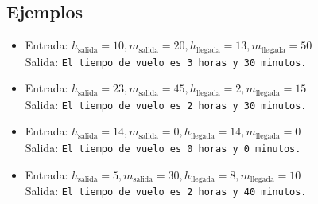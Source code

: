 \begin{enumerate}[label=\alph*)]
    \subsection*{Ejemplos}
    \begin{itemize}
        \item Entrada: \(h_{\text{salida}} = 10, m_{\text{salida}} = 20, h_{\text{llegada}} = 13, m_{\text{llegada}} = 50\)\\
              Salida: \texttt{El tiempo de vuelo es 3 horas y 30 minutos.}
        \item Entrada: \(h_{\text{salida}} = 23, m_{\text{salida}} = 45, h_{\text{llegada}} = 2, m_{\text{llegada}} = 15\)\\
              Salida: \texttt{El tiempo de vuelo es 2 horas y 30 minutos.}
        \item Entrada: \(h_{\text{salida}} = 14, m_{\text{salida}} = 0, h_{\text{llegada}} = 14, m_{\text{llegada}} = 0\)\\
              Salida: \texttt{El tiempo de vuelo es 0 horas y 0 minutos.}
        \item Entrada: \(h_{\text{salida}} = 5, m_{\text{salida}} = 30, h_{\text{llegada}} = 8, m_{\text{llegada}} = 10\)\\
              Salida: \texttt{El tiempo de vuelo es 2 horas y 40 minutos.}
    \end{itemize}
\end{enumerate}

